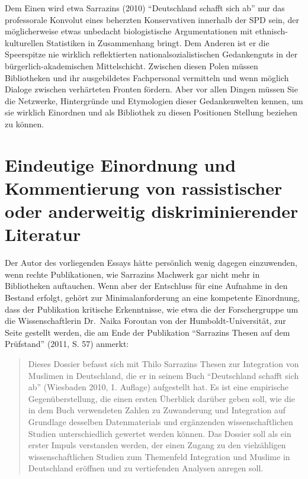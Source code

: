 \documentclass[a4paper,
fontsize=11pt,
oneside,
numbers=noperiodatend,
parskip=half-,
bibliography=totoc,
final
]{scrartcl}
\begin{document}
Dem Einen wird etwa Sarrazins (2010) \enquote{Deutschland schafft sich
ab} nur das professorale Konvolut eines beherzten Konservativen
innerhalb der SPD sein, der möglicherweise etwas unbedacht
biologistische Argumentationen mit ethnisch-kulturellen Statistiken in
Zusammenhang bringt. Dem Anderen ist er die Speerspitze nie wirklich
reflektierten nationalsozialistischen Gedankenguts in der
bürgerlich-akademischen Mittelschicht. Zwischen diesen Polen müssen
Bibliotheken und ihr ausgebildetes Fachpersonal vermitteln und wenn
möglich Dialoge zwischen verhärteten Fronten fördern. Aber vor allen
Dingen müssen Sie die Netzwerke, Hintergründe und Etymologien dieser
Gedankenwelten kennen, um sie wirklich Einordnen und als Bibliothek zu
diesen Positionen Stellung beziehen zu können.

\hypertarget{eindeutige-einordnung-und-kommentierung-von-rassistischer-oder-anderweitig-diskriminierender-literatur}{%
\section*{Eindeutige Einordnung und Kommentierung von rassistischer
oder anderweitig diskriminierender
Literatur}\label{eindeutige-einordnung-und-kommentierung-von-rassistischer-oder-anderweitig-diskriminierender-literatur}}

Der Autor des vorliegenden Essays hätte persönlich wenig dagegen
einzuwenden, wenn rechte Publikationen, wie Sarrazins Machwerk gar nicht
mehr in Bibliotheken auftauchen. Wenn aber der Entschluss für eine
Aufnahme in den Bestand erfolgt, gehört zur Minimalanforderung an eine
kompetente Einordnung, dass der Publikation kritische Erkenntnisse, wie
etwa die der Forschergruppe um die Wissenschaftlerin Dr.~Naika Foroutan
von der Humboldt-Universität, zur Seite gestellt werden, die am Ende der
Publikation \enquote{Sarrazins Thesen auf dem Prüfstand} (2011, S. 57)
anmerkt:

\begin{quote}
Dieses Dossier befasst sich mit Thilo Sarrazins Thesen zur Integration
von Muslimen in Deutschland, die er in seinem Buch \enquote{Deutschland
schafft sich ab} (Wiesbaden 2010, 1. Auflage) aufgestellt hat. Es ist
eine empirische Gegenüberstellung, die einen ersten Überblick darüber
geben soll, wie die in dem Buch verwendeten Zahlen zu Zuwanderung und
Integration auf Grundlage desselben Datenmaterials und ergänzenden
wissenschaftlichen Studien unterschiedlich gewertet werden können. Das
Dossier soll als ein erster Impuls verstanden werden, der einen Zugang
zu den vielzähligen wissenschaftlichen Studien zum Themenfeld
Integration und Muslime in Deutschland eröffnen und zu vertiefenden
Analysen anregen soll.
\end{quote}
\end{document}
